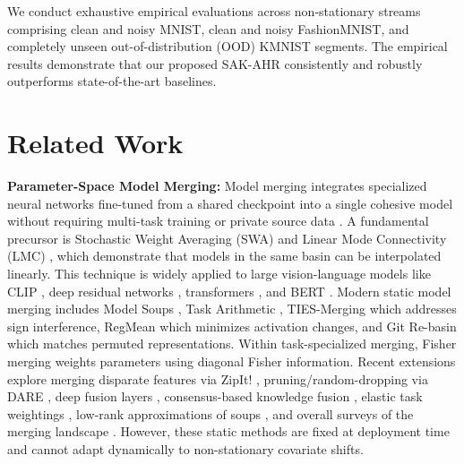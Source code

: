 \documentclass{article}
\theoremstyle{plain}
\theoremstyle{definition}
\theoremstyle{remark}
\begin{document}
We conduct exhaustive empirical evaluations across non-stationary streams comprising clean and noisy MNIST, clean and noisy FashionMNIST, and completely unseen out-of-distribution (OOD) KMNIST segments. The empirical results demonstrate that our proposed SAK-AHR consistently and robustly outperforms state-of-the-art baselines.

\section{Related Work}
\label{sec:related}

\textbf{Parameter-Space Model Merging:} Model merging integrates specialized neural networks fine-tuned from a shared checkpoint into a single cohesive model without requiring multi-task training or private source data \citep{wortsman2022soups, matena2022merging}. A fundamental precursor is Stochastic Weight Averaging (SWA) \citep{izmailov2018swa} and Linear Mode Connectivity (LMC) \citep{frankle2020linear}, which demonstrate that models in the same basin can be interpolated linearly. This technique is widely applied to large vision-language models like CLIP \citep{radford2021clip}, deep residual networks \citep{he2016resnet}, transformers \citep{vaswani2017attention}, and BERT \citep{devlin2018bert}. Modern static model merging includes Model Soups \citep{wortsman2022soups}, Task Arithmetic \citep{ilharco2022editing}, TIES-Merging \citep{yadav2023ties} which addresses sign interference, RegMean \citep{jin2023regmean} which minimizes activation changes, and Git Re-basin \citep{ainsworth2023git} which matches permuted representations. Within task-specialized merging, Fisher merging \citep{matena2022merging} weights parameters using diagonal Fisher information. Recent extensions explore merging disparate features via ZipIt! \citep{stoica2023zip}, pruning/random-dropping via DARE \citep{yu2023dare}, deep fusion layers \citep{choshen2022fusing}, consensus-based knowledge fusion \citep{gueta2023knowledge}, elastic task weightings \citep{daheim2024elastic}, low-rank approximations of soups \citep{schoenauer2024compressing}, and overall surveys of the merging landscape \citep{marx2024merging}. However, these static methods are fixed at deployment time and cannot adapt dynamically to non-stationary covariate shifts.
\end{document}
